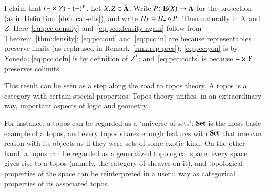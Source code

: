 \begin{pf}
I claim that $(- \times Y) \dashv (-)^Y$.  Let $X, Z \in
\hat{\mathbf{A}}$.  Write $P\from \elt{X} \to \scat{A}$ for the projection
(as in Definition~\ref{defn:cat-elts}), and write $H_P = H_\bullet \mathbin{\circ} P$.
Then
% 
% 
naturally in $X$ and $Z$.  Here~\eqref{eq:pcc:density}
and~\eqref{eq:pcc:density-again} follow from Theorem~\ref{thm:density};
\eqref{eq:pcc:out} and~\eqref{eq:pcc:in} are because representables
preserve limits (as rephrased in Remark~\ref{rmk:rep-pres});
\eqref{eq:pcc:yon} is by Yoneda; \eqref{eq:pcc:defn} is by definition of
$Z^Y$; and~\eqref{eq:pcc:cocts} is because $-\times Y$ preserves
colimits.
\end{pf}

This result can be seen as a step along the road to topos%
%
%
theory.  A topos is a category with certain special properties.  Topos
theory unifies, in an extraordinary way, important aspects of logic and
geometry.

For instance, a topos can be regarded as a `universe of sets':%
%
%
$\mathbf{Set}$ is the most basic example of a topos, and every topos shares enough
features with $\mathbf{Set}$ that one can reason with its objects as if they were
sets of some exotic kind.  On the other hand, a topos can be regarded as a
generalized topological space:%
%
%
every space gives rise to a topos (namely, the category of sheaves%
%
%
on it), and topological properties of the space can be reinterpreted in a
useful way as categorical properties of its associated topos.

